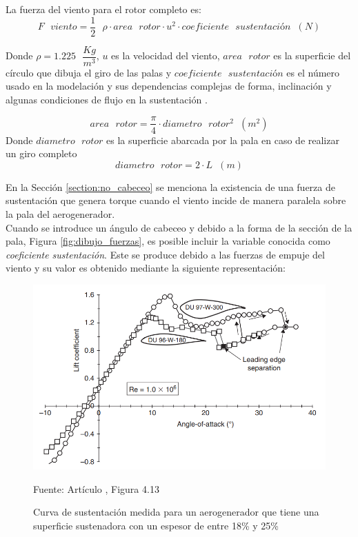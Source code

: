  
La fuerza del viento para el rotor completo es:
 \begin{equation}
  F \text{ } viento = \dfrac{1}{2} \text{ } \rho \cdot area \text{ } rotor \cdot u^2 \cdot coeficiente \text{ } sustentación \hspace{7pt} (N)
   \end{equation}
   
    Donde $\rho = 1.225 \text{ } \dfrac{Kg}{m^3}$, $u$ es la velocidad del viento, $area \text{ } rotor$ es la superficie del círculo que dibuja el giro de las palas y $coeficiente \text{ } sustentación$ es el número usado en la modelación y sus dependencias complejas de forma, inclinación y algunas condiciones de flujo en la sustentación \cite{Hall2021}.
    
  \begin{equation}
  area \text{ } rotor = \dfrac{\pi}{4} \cdot diametro \text{ } rotor^2 \hspace{7pt} (m^2) 
  \end{equation}
  Donde $diametro \text{ } rotor $ es la superficie abarcada por la pala en caso de realizar un giro completo
  \begin{equation}
  diametro \text{ } rotor = 2 \cdot L \hspace{7pt} (m)
 \end{equation}

 En la Sección \ref{section:no_cabeceo} se menciona la existencia de una fuerza de sustentación que genera torque cuando el viento incide de manera paralela sobre la pala del aerogenerador.\\
 
 Cuando se introduce un ángulo de cabeceo y debido a la forma de la sección de la pala, Figura \ref{fig:dibujo_fuerzas}, es posible incluir la variable conocida como \textit{coeficiente sustentación}. Este se produce debido a las fuerzas de empuje del viento y su valor es obtenido mediante la siguiente representación:
 
 \begin{figure}[H]
    \centering
    \includegraphics[width=1\textwidth]{images/imagen del coeficiente sustentacion.PNG}
    \caption{Curva de sustentación medida para un aerogenerador que tiene una superficie sustenadora con un espesor de entre 18\% y 25\% }
    Fuente: Artículo \cite{TIMMER2013109}, Figura 4.13
    \label{fig:plot_coef_sustentacion}
\end{figure}



